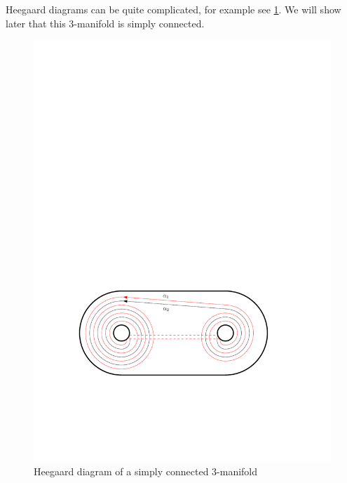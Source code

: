 \begin{example}
Heegaard diagrams can be quite complicated, for example see \cref{hd1}. We will show later that this 3-manifold is simply connected.

\begin{figure}[tb]
\centering
\includegraphics[scale=.9]{graphics/hd1}
\caption{Heegaard diagram of a simply connected 3-manifold}
\label{hd1}
\end{figure}
\end{example}




